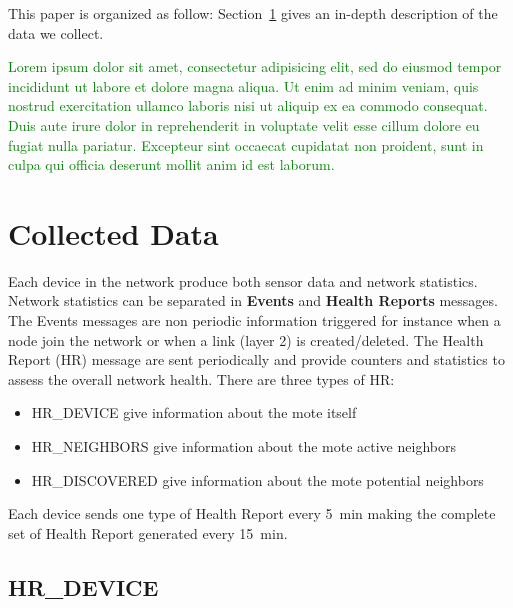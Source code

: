 \documentclass{sig-alternate}
\newcommand{\lorem}               {\textcolor{green}{Lorem ipsum dolor sit amet, consectetur adipisicing elit, sed do eiusmod tempor incididunt ut labore et dolore magna aliqua. Ut enim ad minim veniam, quis nostrud exercitation ullamco laboris nisi ut aliquip ex ea commodo consequat. Duis aute irure dolor in reprehenderit in voluptate velit esse cillum dolore eu fugiat nulla pariatur. Excepteur sint occaecat cupidatat non proident, sunt in culpa qui officia deserunt mollit anim id est laborum.}}
\begin{document}
This paper is organized as follow:
Section~\ref{sec:collected} gives an in-depth description of the data we collect.

\lorem

\section{Collected Data}
\label{sec:collected}


Each device in the network produce both sensor data and network statistics.
Network statistics can be separated in \textbf{Events} and \textbf{Health Reports} messages.
The Events messages are non periodic information triggered for instance when a node join the network or when a link (layer 2) is created/deleted.
The Health Report (HR) message are sent periodically and provide counters and statistics to assess the overall network health.
There are three types of HR:
\begin{itemize}
  \item HR\_DEVICE give information about the mote itself
  \item HR\_NEIGHBORS give information about the mote active neighbors
  \item HR\_DISCOVERED give information about the mote potential neighbors
\end{itemize}
Each device sends one type of Health Report every 5~min making the complete set of Health Report generated every 15~min.

\subsection{HR\_DEVICE}
\end{document}
